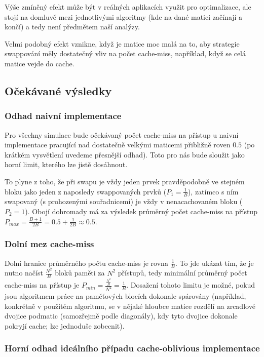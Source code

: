 \documentclass[a4paper,12pt]{article} %
\begin{document}
Výše zmíněný efekt může být v reálných aplikacích využit pro optimalizace, ale stojí na domluvě mezi jednotlivými algoritmy (kde na dané matici začínají a končí) a tedy není předmětem naší analýzy.

Velmi podobný efekt vznikne, když je matice moc malá na to, aby strategie swappování měly dostatečný vliv na počet cache-miss, například, když se celá matice vejde do cache.

\subsection*{Očekávané výsledky}

\subsubsection*{Odhad naivní implementace}

Pro všechny simulace bude očekávaný počet cache-miss na přístup u naivní implementace pracující nad dostatečně velkými maticemi přibližně roven $0.5$ (po krátkém vysvětlení uvedeme přesnější odhad). Toto pro nás bude sloužit jako horní limit, kterého lze jistě dosáhnout.

To plyne z toho, že při swapu je vždy jeden prvek pravděpodobně ve stejném bloku jako jeden z naposledy swappovaných prvků ($P_1 = \frac{1}{B}$), zatímco s ním swapovaný (s prohozenými souřadnicemi) je vždy v nenacachovaném bloku ($P_2 = 1$). Obojí dohromady má za výsledek průměrný počet cache-miss na přístup $P_{max} = \frac{B + 1}{2B} = 0.5 + \frac{1}{2B} \approx 0.5$.

\subsubsection*{Dolní mez cache-miss}

Dolní hranice průměrného počtu cache-miss je rovna $\frac{1}{B}$. To jde ukázat tím, že je nutno načíst $\frac{N^2}{B}$ bloků paměti za $N^2$ přístupů, tedy minimální průměrný počet cache-miss na přístup je $P_{min} = \frac{\frac{N^2}{B}}{N^2} = \frac{1}{B}$. Dosažení tohoto limitu je možné, pokud jsou algoritmem práce na paměťových blocích dokonale spárovány (například, konkrétně v použitém algoritmu, se v nějaké hloubce matice rozdělí na zrcadlové dvojice podmatic (samozřejmě podle diagonály), kdy tyto dvojice dokonale pokryjí cache; lze jednoduše zobecnit).

\subsubsection*{Horní odhad ideálního případu cache-oblivious implementace}
\end{document}
